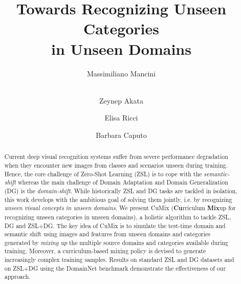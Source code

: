 \documentclass[runningheads]{llncs}
\newcommand{\methodName}{{CuMix} }
\newcommand{\methodNameFull}{\textbf{Cu}rriculum \textbf{Mix}up for recognizing unseen categories in unseen domains}
\begin{document}
\pagestyle{headings}
\mainmatter
\def\ECCVSubNumber{4355}  

\title{Towards Recognizing Unseen Categories\\ in Unseen Domains}



\author{Massimiliano Mancini \and
\\Zeynep Akata \and
Elisa Ricci \and
Barbara Caputo}
\maketitle

\begin{abstract} 
Current deep visual recognition systems suffer from severe performance degradation when they encounter new images from classes and scenarios unseen during training. Hence, the core challenge of Zero-Shot Learning (ZSL) is to cope with the \textit{semantic-shift} whereas the main challenge of Domain Adaptation and Domain Generalization (DG) is the \textit{domain-shift}. 
While historically ZSL and DG tasks are tackled in isolation, this work develops with the ambitious goal of solving them jointly, i.e. by recognizing \emph{unseen visual concepts in unseen domains}. We present \methodName (\methodNameFull), a holistic algorithm to tackle ZSL, DG and ZSL+DG. The key idea of \methodName is to simulate the test-time domain and semantic shift using images and features from unseen domains and categories generated by \textit{mixing up} the multiple source domains and categories available during training. Moreover, a curriculum-based mixing policy is devised to generate increasingly complex training samples.
Results on standard ZSL and DG datasets and on ZSL+DG using the DomainNet benchmark demonstrate the effectiveness of our approach.


\end{abstract}
\end{document}
